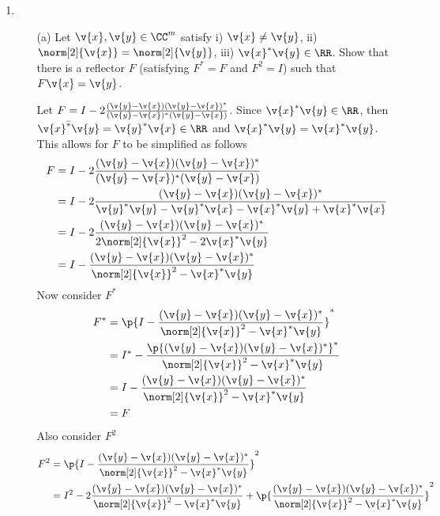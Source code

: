 \documentclass[11pt]{article}
\begin{document}
\begin{enumerate}
    \item %
        \begin{enumerate}
            \item[(a)] %
                Let $\v{x}, \v{y} \in \CC^m$ satisfy i) $\v{x} \neq \v{y}$, ii)
                $\norm[2]{\v{x}} = \norm[2]{\v{y}}$, iii)
                $\v{x}^* \v{y} \in \RR$.
                Show that there is a reflector $F$ (satisfying $F^* = F$ and $F^2 = I$)
                such that $F\v{x} = \v{y}$.

                Let $F = I - 2 \frac{(\v{y} - \v{x})(\v{y} - \v{x})^*}{(\v{y} - \v{x})^*(\v{y} - \v{x})}$.
                Since $\v{x}^* \v{y} \in \RR$, then
                $\bar{\v{x}^* \v{y}} = \v{y}^* \v{x} \in \RR$ and
                $\v{x}^* \v{y} = \v{x}^* \v{y}$.
                This allows for $F$ to be simplified as follows
                \begin{align*}
                    F &= I - 2 \frac{(\v{y} - \v{x})(\v{y} - \v{x})^*}{(\v{y} - \v{x})^*(\v{y} - \v{x})} \\
                      &= I - 2 \frac{(\v{y} - \v{x})(\v{y} - \v{x})^*}{\v{y}^*\v{y} - \v{y}^*\v{x} - \v{x}^*\v{y} + \v{x}^*\v{x}} \\
                      &= I - 2 \frac{(\v{y} - \v{x})(\v{y} - \v{x})^*}{2\norm[2]{\v{x}}^2 - 2\v{x}^*\v{y}} \\
                      &= I - \frac{(\v{y} - \v{x})(\v{y} - \v{x})^*}{\norm[2]{\v{x}}^2 - \v{x}^*\v{y}} \\
                \end{align*}
                Now consider $F^*$
                \begin{align*}
                    F^* &= \p{I - \frac{(\v{y} - \v{x})(\v{y} - \v{x})^*}{\norm[2]{\v{x}}^2 - \v{x}^*\v{y}}}^* \\
                        &= I^* - \frac{\p{(\v{y} - \v{x})(\v{y} - \v{x})^*}^*}{\norm[2]{\v{x}}^2 - \v{x}^*\v{y}} \\
                        &= I - \frac{(\v{y} - \v{x})(\v{y} - \v{x})^*}{\norm[2]{\v{x}}^2 - \v{x}^*\v{y}} \\
                        &= F
                \end{align*}
                Also consider $F^2$
                \begin{align*}
                    F^2 &= \p{I - \frac{(\v{y} - \v{x})(\v{y} - \v{x})^*}{\norm[2]{\v{x}}^2 - \v{x}^*\v{y}}}^2 \\
                        &= I^2 - 2\frac{(\v{y} - \v{x})(\v{y} - \v{x})^*}{\norm[2]{\v{x}}^2 - \v{x}^*\v{y}} + \p{\frac{(\v{y} - \v{x})(\v{y} - \v{x})^*}{\norm[2]{\v{x}}^2 - \v{x}^*\v{y}}}^2 \\

\end{align*}
\end{enumerate}
\end{enumerate}
\end{document}
